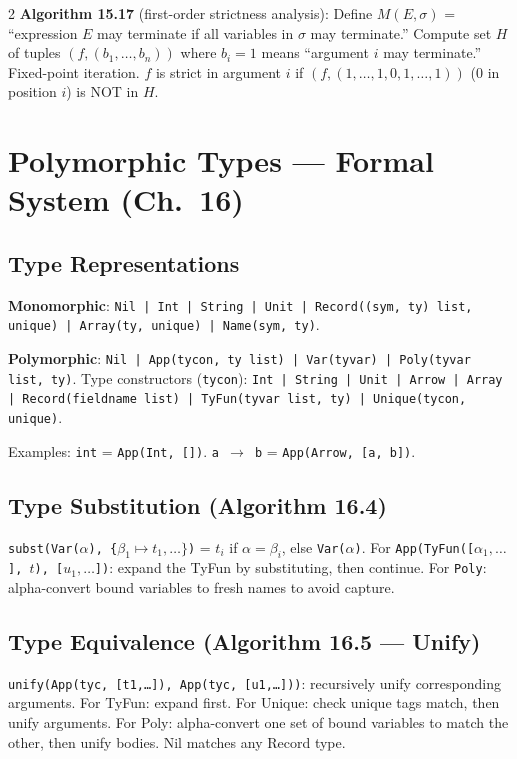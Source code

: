 \documentclass[9pt,landscape]{extarticle}
\begin{document}
\begin{multicols}{2}
\textbf{Algorithm 15.17} (first-order strictness analysis): Define $M(E, \sigma)$ = ``expression $E$ may terminate if all variables in $\sigma$ may terminate.'' Compute set $H$ of tuples $(f, (b_1, \ldots, b_n))$ where $b_i = 1$ means ``argument $i$ may terminate.'' Fixed-point iteration. $f$ is strict in argument $i$ if $(f, (1, \ldots, 1, 0, 1, \ldots, 1))$ (0 in position $i$) is NOT in $H$.

\section{Polymorphic Types --- Formal System (Ch.~16)}

\subsection{Type Representations}

\textbf{Monomorphic}: \texttt{Nil | Int | String | Unit | Record((sym, ty) list, unique) | Array(ty, unique) | Name(sym, ty)}.

\textbf{Polymorphic}: \texttt{Nil | App(tycon, ty list) | Var(tyvar) | Poly(tyvar list, ty)}. Type constructors (\texttt{tycon}): \texttt{Int | String | Unit | Arrow | Array | Record(fieldname list) | TyFun(tyvar list, ty) | Unique(tycon, unique)}.

Examples: \texttt{int} = \texttt{App(Int, [])}. \texttt{a $\to$ b} = \texttt{App(Arrow, [a, b])}.

\subsection{Type Substitution (Algorithm 16.4)}

\texttt{subst(Var($\alpha$), \{$\beta_1 \mapsto t_1, \ldots\}$)} = $t_i$ if $\alpha = \beta_i$, else \texttt{Var($\alpha$)}. For \texttt{App(TyFun([$\alpha_1, \ldots$], $t$), [$u_1, \ldots$])}: expand the TyFun by substituting, then continue. For \texttt{Poly}: alpha-convert bound variables to fresh names to avoid capture.

\subsection{Type Equivalence (Algorithm 16.5 --- Unify)}

\texttt{unify(App(tyc, [t1,\ldots]), App(tyc, [u1,\ldots]))}: recursively unify corresponding arguments. For TyFun: expand first. For Unique: check unique tags match, then unify arguments. For Poly: alpha-convert one set of bound variables to match the other, then unify bodies. Nil matches any Record type.


\end{multicols}
\end{document}
